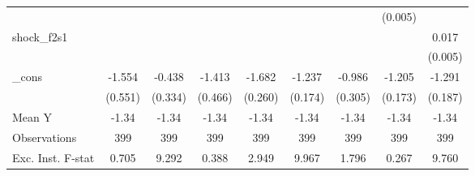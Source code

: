 {\begin{tabular}{l*{8}{c}}
            &                     &                     &                     &                     &                     &                     &     (0.005)         &                     \\
\addlinespace
shock\_f2s1  &                     &                     &                     &                     &                     &                     &                     &       0.017\sym{***}\\
            &                     &                     &                     &                     &                     &                     &                     &     (0.005)         \\
\addlinespace
\_cons      &      -1.554\sym{**} &      -0.438         &      -1.413\sym{***}&      -1.682\sym{***}&      -1.237\sym{***}&      -0.986\sym{***}&      -1.205\sym{***}&      -1.291\sym{***}\\
            &     (0.551)         &     (0.334)         &     (0.466)         &     (0.260)         &     (0.174)         &     (0.305)         &     (0.173)         &     (0.187)         \\
\midrule
Mean Y      &       -1.34         &       -1.34         &       -1.34         &       -1.34         &       -1.34         &       -1.34         &       -1.34         &       -1.34         \\
Observations&         399         &         399         &         399         &         399         &         399         &         399         &         399         &         399         \\
Exc. Inst. F-stat&       0.705         &       9.292         &       0.388         &       2.949         &       9.967         &       1.796         &       0.267         &       9.760         \\
\bottomrule
\end{tabular}
}
